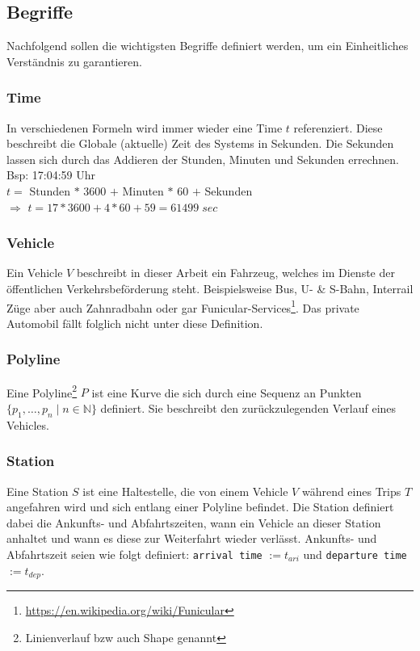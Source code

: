 \begin{newpage}

  \subsection{Begriffe}
  \label{sub:begriffe}
    Nachfolgend sollen die wichtigsten Begriffe definiert werden, um ein Einheitliches Verständnis zu garantieren.

    \subsubsection{Time}
    \label{ssub:time}
      In verschiedenen Formeln wird immer wieder eine Time $t$ referenziert. Diese beschreibt die Globale (aktuelle) Zeit des Systems in Sekunden. 
      Die Sekunden lassen sich durch das Addieren der Stunden, Minuten und Sekunden errechnen.\\

      Bsp: 17:04:59 Uhr\\

      $t = $ Stunden $*$ 3600 $+$ Minuten $*$ 60 $+$ Sekunden\\
      $\Rightarrow$ $t = 17 * 3600 + 4 * 60 + 59 = 61499 \; sec$
      

    \subsubsection{Vehicle}
    \label{ssub:vehicle}
      Ein Vehicle $V$ beschreibt in dieser Arbeit ein Fahrzeug, welches im Dienste der öffentlichen Verkehrsbeförderung steht. Beispielsweise Bus, U- \& S-Bahn, Interrail Züge aber auch Zahnradbahn oder gar Funicular-Services\footnote{\url{https://en.wikipedia.org/wiki/Funicular}}. Das private Automobil fällt folglich nicht unter diese Definition.

    \subsubsection{Polyline}
    \label{ssub:polyline}
      Eine Polyline\footnote{Linienverlauf bzw auch Shape genannt} $P$ ist eine Kurve die sich durch eine Sequenz an Punkten $\{ p_1, \dotsc, p_n \;|\; n \in \mathbb{N} \}$ definiert. Sie beschreibt den zurückzulegenden Verlauf eines Vehicles.

    \subsubsection{Station}
    \label{ssub:station}
      Eine Station $S$ ist eine Haltestelle, die von einem Vehicle $V$ während eines Trips $T$ angefahren wird und sich entlang einer Polyline befindet. Die Station definiert dabei die Ankunfts- und Abfahrtszeiten, wann ein Vehicle an dieser Station anhaltet und wann es diese zur Weiterfahrt wieder verlässt. Ankunfts- und Abfahrtszeit seien wie folgt definiert: \texttt{arrival time} $ := t_{ari}$ und \texttt{departure time} $ := t_{dep}$.


\end{newpage}
